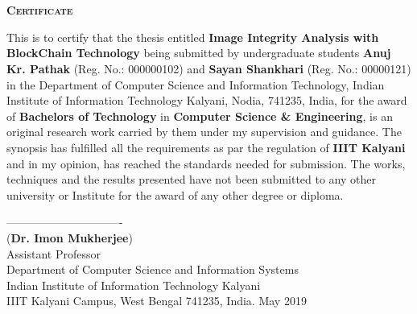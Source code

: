 \newpage
\chapter*{}
\begin{center}
\textbf{\textsc{\Large Certificate}}\\[0.75cm]
\end{center}

\onehalfspacing This is to certify that the thesis entitled
\textbf{Image Integrity Analysis with BlockChain Technology} being submitted by undergraduate students \textbf{Anuj Kr. Pathak} (Reg. No.: 000000102) and \textbf{Sayan Shankhari} (Reg. No.: 00000121) in the Department of Computer Science and Information Technology, Indian Institute of Information Technology Kalyani, Nodia, 741235, India, for the award of \textbf{Bachelors of Technology} in \textbf{Computer Science \& Engineering}, is an original research work carried by them under my supervision and guidance. The synopsis has fulfilled all the requirements as par the regulation of \textbf{IIIT Kalyani} and in my opinion, has reached the standards needed for submission. The works, techniques and the results presented have not been submitted to any other university or Institute for the award of any other degree or diploma.\\
\bigskip
\bigskip
\bigskip
\bigskip
\bigskip
\bigskip
\bigskip
\begin{flushleft}
\bigskip
-------------------------------\\
(\textbf{Dr. Imon Mukherjee})\\
\smallskip
Assistant Professor\\
Department of Computer Science and Information Systems\\
Indian Institute of Information Technology Kalyani\\
IIIT Kalyani Campus, West Bengal 741235, India.
May 2019\\
\end{flushleft}
